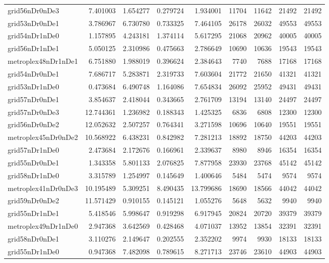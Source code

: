 \begin{longtable}{|l|r|r|r|r|r|r|r|r|}
grid56nDr0nDe3 & 7.401003 & 1.654277 & 0.279724 & 1.934001 & 11704 & 11642 & 21492 & 21492 \\
grid53nDr0nDe1 & 3.786967 & 6.730780 & 0.733325 & 7.464105 & 26178 & 26032 & 49553 & 49553 \\
grid54nDr1nDe0 & 1.157895 & 4.243181 & 1.374114 & 5.617295 & 21068 & 20962 & 40005 & 40005 \\
grid56nDr1nDe1 & 5.050125 & 2.310986 & 0.475663 & 2.786649 & 10690 & 10636 & 19543 & 19543 \\
metroplex48nDr1nDe1 & 6.751880 & 1.988019 & 0.396624 & 2.384643 & 7740 & 7688 & 17168 & 17168 \\
grid54nDr0nDe1 & 7.686717 & 5.283871 & 2.319733 & 7.603604 & 21772 & 21650 & 41321 & 41321 \\
grid53nDr1nDe0 & 0.473684 & 6.490748 & 1.164086 & 7.654834 & 26092 & 25952 & 49431 & 49431 \\
grid57nDr0nDe1 & 3.854637 & 2.418044 & 0.343665 & 2.761709 & 13194 & 13140 & 24497 & 24497 \\
grid57nDr0nDe3 & 12.744361 & 1.236982 & 0.188343 & 1.425325 & 6836 & 6808 & 12300 & 12300 \\
grid56nDr0nDe2 & 12.052632 & 2.507257 & 0.764341 & 3.271598 & 10696 & 10640 & 19551 & 19551 \\
metroplex45nDr0nDe2 & 10.568922 & 6.438231 & 0.842982 & 7.281213 & 18892 & 18750 & 44203 & 44203 \\
grid57nDr1nDe0 & 2.473684 & 2.172676 & 0.166961 & 2.339637 & 8980 & 8946 & 16354 & 16354 \\
grid55nDr0nDe1 & 1.343358 & 5.801133 & 2.076825 & 7.877958 & 23930 & 23768 & 45142 & 45142 \\
grid58nDr1nDe0 & 3.315789 & 1.254997 & 0.145649 & 1.400646 & 5484 & 5474 & 9574 & 9574 \\
metroplex41nDr0nDe3 & 10.195489 & 5.309251 & 8.490435 & 13.799686 & 18690 & 18566 & 44042 & 44042 \\
grid59nDr0nDe2 & 11.571429 & 0.910155 & 0.145121 & 1.055276 & 5648 & 5632 & 9940 & 9940 \\
grid55nDr1nDe1 & 5.418546 & 5.998647 & 0.919298 & 6.917945 & 20824 & 20720 & 39379 & 39379 \\
metroplex49nDr1nDe0 & 2.947368 & 3.642569 & 0.428468 & 4.071037 & 13952 & 13854 & 32391 & 32391 \\
grid58nDr0nDe1 & 3.110276 & 2.149647 & 0.202555 & 2.352202 & 9974 & 9930 & 18133 & 18133 \\
grid55nDr1nDe0 & 0.947368 & 7.482098 & 0.789615 & 8.271713 & 23746 & 23610 & 44903 & 44903 \\

\end{longtable}
